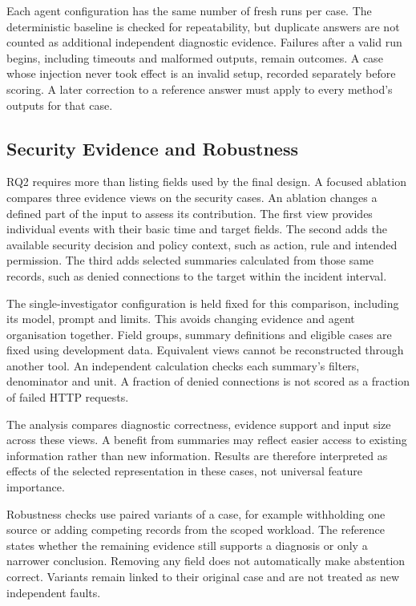 Each agent configuration has the same number of fresh runs per case.
The deterministic baseline is checked for repeatability, but duplicate
answers are not counted as additional independent diagnostic evidence.
Failures after a valid run begins, including timeouts and malformed
outputs, remain outcomes. A case whose injection never took effect is
an invalid setup, recorded separately before scoring. A later correction
to a reference answer must apply to every method's outputs for that case.


\subsection{Security Evidence and Robustness}

RQ2 requires more than listing fields used by the final design. A focused
ablation compares three evidence views on the security cases. An ablation
changes a defined part of the input to assess its contribution. The first
view provides individual events with their basic time and target fields.
The second adds the available security decision and policy context, such
as action, rule and intended permission. The third adds selected summaries
calculated from those same records, such as denied connections to the
target within the incident interval.

The single-investigator configuration is held fixed for this comparison,
including its model, prompt and limits. This avoids changing evidence
and agent organisation together. Field groups, summary definitions and
eligible cases are fixed using development data. Equivalent views cannot
be reconstructed through another tool. An independent calculation checks
each summary's filters, denominator and unit. A fraction of denied
connections is not scored as a fraction of failed HTTP requests.

The analysis compares diagnostic correctness, evidence support and input
size across these views. A benefit from summaries may reflect easier
access to existing information rather than new information. Results are
therefore interpreted as effects of the selected representation in these
cases, not universal feature importance.

Robustness checks use paired variants of a case, for example withholding
one source or adding competing records from the scoped workload. The
reference states whether the remaining evidence still supports a diagnosis
or only a narrower conclusion. Removing any field does not automatically
make abstention correct. Variants remain linked to their original case
and are not treated as new independent faults.

